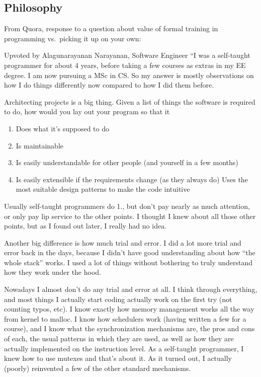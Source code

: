 \documentclass{article}
\begin{document}
\subsection{Philosophy}
From Quora, response to a question about value of formal training in
programming vs.\ picking it up on your own:

Upvoted by Alagunarayanan Narayanan, Software Engineer ``I was a
self-taught programmer for about 4 years, before taking a few courses
as extras in my EE degree. I am now pursuing a MSc in CS\@. So my answer
is mostly observations on how I do things differently now compared to
how I did them before.

Architecting projects is a big thing. Given a list of things the
software is required to do, how would you lay out your program so that
it
\begin{enumerate}
    \item Does what it's supposed to do
    \item Is maintainable
    \item Is easily understandable for other people (and yourself in a few
        months)
    \item Is easily extensible if the requirements change (as they always do)
        Uses the most suitable design patterns to make the code intuitive
\end{enumerate}
Usually self-taught programmers do 1., but don't pay nearly as much
attention, or only pay lip service to the other points. I thought I
knew about all those other points, but as I found out later, I really
had no idea.

Another big difference is how much trial and error. I did a lot more
trial and error back in the days, because I didn't have good
understanding about how ``the whole stack'' works. I used a lot of
things without bothering to truly understand how they work under the
hood.

Nowadays I almost don't do any trial and error at all. I think through
everything, and most things I actually start coding actually work on
the first try (not counting typos, etc). I know exactly how memory
management works all the way from kernel to malloc. I know how
schedulers work (having written a few for a course), and I know what
the synchronization mechanisms are, the pros and cons of each, the
usual patterns in which they are used, as well as how they are
actually implemented on the instruction level. As a self-taught
programmer, I knew how to use mutexes and that's about it. As it
turned out, I actually (poorly) reinvented a few of the other standard
mechanisms.
\end{document}
